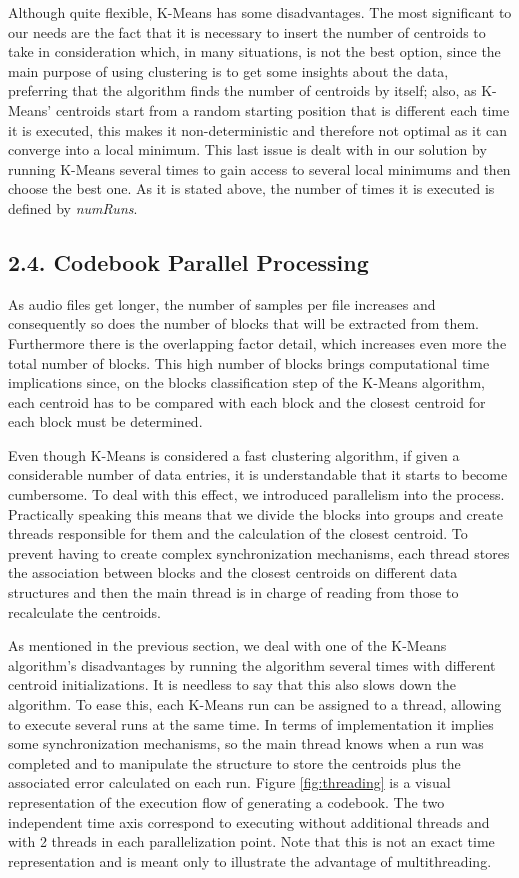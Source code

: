 \documentclass[12pt]{article}
\begin{document}
Although quite flexible, K-Means has some disadvantages.
The most significant to our needs are the fact that it is necessary to insert the 
number of centroids to take in consideration which, in many situations, is not 
the best option, since the main purpose of using clustering is to get some 
insights about the data, preferring that the algorithm finds the number of 
centroids by itself; also, as K-Means' centroids start from a random starting 
position that is different each time it is executed, this makes it non-deterministic
and therefore not optimal as it can converge into a local minimum.
This last issue is dealt with in our solution by running K-Means several times to 
gain access to several local minimums and then choose the best one. 
As it is stated above, the number of times it is executed is defined by {\it numRuns\/}.

\newpage
\subsection*{2.4. Codebook Parallel Processing}

As audio files get longer, the number of samples per file increases and 
consequently so does the number of blocks that will be extracted from them.
Furthermore there is the overlapping factor detail, which increases even more 
the total number of blocks.
This high number of blocks brings computational time implications since, on the 
blocks classification step of the K-Means algorithm, each centroid has to be 
compared with each block and the closest centroid for each block must be determined.

Even though K-Means is considered a fast clustering algorithm, if given a 
considerable number of data entries, it is understandable that it starts to 
become cumbersome. 
To deal with this effect, we introduced parallelism into the process.
Practically speaking this means that we divide the blocks into groups and create
threads responsible for them and the calculation of the closest centroid.
To prevent having to create complex synchronization mechanisms, each thread 
stores the association between blocks and the closest centroids on different 
data structures and then the main thread is in charge of reading from those to 
recalculate the centroids.

As mentioned in the previous section, we deal with one of the K-Means algorithm's
disadvantages by running the algorithm several times with different centroid initializations.
It is needless to say that this also slows down the algorithm.
To ease this, each K-Means run can be assigned to a thread, allowing to execute 
several runs at the same time.
In terms of implementation it implies some synchronization mechanisms, so the 
main thread knows when a run was completed and to manipulate the structure to 
store the centroids plus the associated error calculated on each run.
Figure \ref{fig:threading} is a visual representation of the execution flow of 
generating a codebook. 
The two independent time axis correspond to executing without additional threads 
and with 2 threads in each parallelization point.
Note that this is not an exact time representation and is meant only to illustrate
the advantage of multithreading. 
\end{document}
